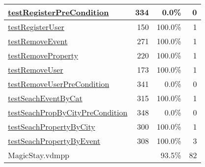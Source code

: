 \begin{longtable}{|l|r|r|r|}
\hline
\hyperref[testRegisterPreCondition:334]{testRegisterPreCondition} & 334&0.0\% & 0 \\
\hline
\hyperref[testRegisterUser:150]{testRegisterUser} & 150&100.0\% & 1 \\
\hline
\hyperref[testRemoveEvent:271]{testRemoveEvent} & 271&100.0\% & 1 \\
\hline
\hyperref[testRemoveProperty:220]{testRemoveProperty} & 220&100.0\% & 1 \\
\hline
\hyperref[testRemoveUser:173]{testRemoveUser} & 173&100.0\% & 1 \\
\hline
\hyperref[testRemoveUserPreCondition:341]{testRemoveUserPreCondition} & 341&0.0\% & 0 \\
\hline
\hyperref[testSeachEventByCat:315]{testSeachEventByCat} & 315&100.0\% & 1 \\
\hline
\hyperref[testSeachPropByCityPreCondition:348]{testSeachPropByCityPreCondition} & 348&0.0\% & 0 \\
\hline
\hyperref[testSeachPropertyByCity:300]{testSeachPropertyByCity} & 300&100.0\% & 1 \\
\hline
\hyperref[testSeachPropertyByEvent:308]{testSeachPropertyByEvent} & 308&100.0\% & 3 \\
\hline
\hline
MagicStay.vdmpp & & 93.5\% & 82 \\
\hline
\end{longtable}

